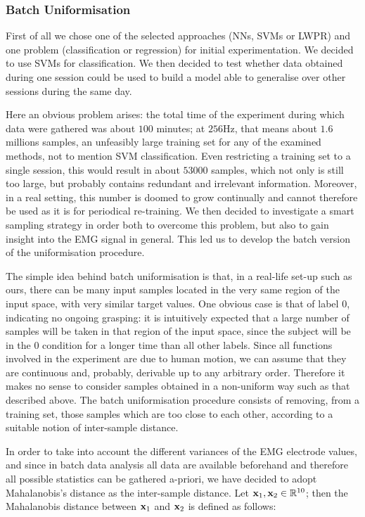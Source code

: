\subsubsection{Batch Uniformisation}

First of all we chose one of the selected approaches (NNs, SVMs or
LWPR) and one problem (classification or regression) for initial
experimentation. We decided to use SVMs for classification. We then
decided to test whether data obtained during one session could be used
to build a model able to generalise over other sessions during the
same day.

Here an obvious problem arises: the total time of the experiment
during which data were gathered was about $100$ minutes; at $256$Hz,
that means about $1.6$ millions samples, an unfeasibly large training
set for any of the examined methods, not to mention SVM
classification. Even restricting a training set to a single session,
this would result in about $53000$ samples, which not only is still
too large, but probably contains redundant and irrelevant
information. Moreover, in a real setting, this number is doomed to
grow continually and cannot therefore be used as it is for periodical
re-training. We then decided to investigate a smart sampling strategy
in order both to overcome this problem, but also to gain insight into
the EMG signal in general. This led us to develop the batch version of
the uniformisation procedure.

The simple idea behind batch uniformisation is that, in a real-life
set-up such as ours, there can be many input samples located in the
very same region of the input space, with very similar target
values. One obvious case is that of label $0$, indicating no ongoing
grasping: it is intuitively expected that a large number of samples
will be taken in that region of the input space, since the subject
will be in the $0$ condition for a longer time than all other
labels. Since all functions involved in the experiment are due to
human motion, we can assume that they are continuous and, probably,
derivable up to any arbitrary order. Therefore it makes no sense to
consider samples obtained in a non-uniform way such as that described
above. The batch uniformisation procedure consists of removing, from a
training set, those samples which are too close to each other,
according to a suitable notion of inter-sample distance.

In order to take into account the different variances of the EMG
electrode values, and since in batch data analysis all data are
available beforehand and therefore all possible statistics can be
gathered a-priori, we have decided to adopt Mahalanobis's distance as
the inter-sample distance. Let $\mathbf{x}_1, \mathbf{x}_2 \in \mathbb{R}^{10}$; then the
Mahalanobis distance between $\mathbf{x}_1$ and $\mathbf{x}_2$ is defined as
follows:

